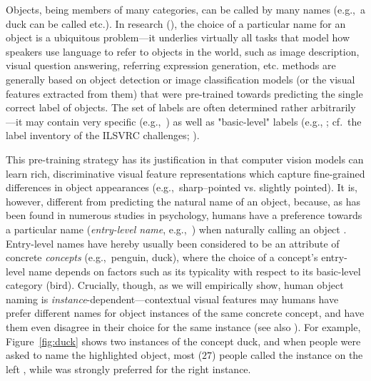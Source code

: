 
Objects, being members of many categories, can be called by many names (e.g.,\ a duck can be called  etc.). 
In \langvis research (\lv), the choice of a particular name for an object is a ubiquitous problem---it underlies virtually all tasks that model how speakers use language to refer to objects in the world, such as image description, visual question answering, referring expression generation, etc. 
%
\lv methods are generally based on object detection or image classification models (or the visual features extracted from them) that were pre-trained towards predicting the single correct label of objects. 
The set of labels are often determined rather arbitrarily---it may contain very specific (e.g.,\ ) as well as "basic-level" labels (e.g., ; cf.\ the label inventory of the ILSVRC challenges; \citealt{ILSVRC15}). 

This pre-training strategy has its justification in that computer vision models can learn rich, discriminative visual feature representations which capture fine-grained differences in object appearances (e.g.,\ sharp--pointed vs. slightly pointed). 
It is, however, different from predicting the natural name of an object, 
because, as has been found in numerous studies in psychology, humans have a preference towards a particular name (\textit{entry-level name}, e.g.,\ ) when naturally calling an object  \cite{rosch1976basic,Rosch1978,jolicoeur1984pictures}. 
Entry-level names have hereby usually been considered to be an attribute of concrete \textit{concepts} (e.g.,\ penguin, duck), where the choice of a concept's entry-level name depends on factors such as its typicality with respect to its basic-level category (bird).  
Crucially, though, as we will empirically show, human object naming is \textit{instance}-dependent---contextual visual features may humans have prefer different names for object instances of the same concrete concept, and have them even disagree in their choice for the same instance (see also \citealt{graf2016animal}). 
For example, Figure~\ref{fig:duck} shows two instances of the concept duck, and when people were asked to name the highlighted object, most ($27$) people called the instance on the left , while  was strongly preferred for the right instance. 

